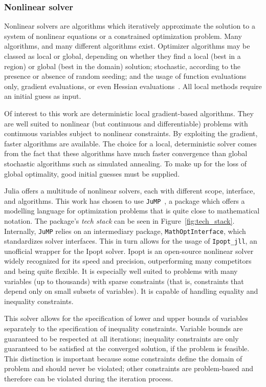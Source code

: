 \subsubsection{Nonlinear solver}

Nonlinear solvers are algorithms which iteratively approximate the solution to a system of nonlinear equations or a constrained optimization problem. Many algorithms, and many different algorithms exist. Optimizer algorithms may be classed as local or global, depending on whether they find a local (best in a region) or global (best in the domain) solution; stochastic, according to the presence or absence of random seeding; and the usage of function evaluations only, gradient evaluations, or even Hessian evaluations~\cite{numerical_recipes}. All local methods require an initial guess as input.

Of interest to this work are deterministic local gradient-based algorithms. They are well suited to nonlinear (but continuous and differentiable) problems with continuous variables subject to nonlinear constraints. By exploiting the gradient, faster algorithms are available. The choice for a local, deterministic solver comes from the fact that these algorithms have much faster convergence than global stochastic algorithms such as simulated annealing. To make up for the loss of global optimality, good initial guesses must be supplied.

Julia offers a multitude of nonlinear solvers, each with different scope, interface, and algorithms. This work has chosen to use \texttt{JuMP}~\cite{jump}, a package which offers a modelling language for optimization problems that is quite close to mathematical notation. The package's \textit{tech stack} can be seen in Figure~\ref{fig:tech_stack}. Internally, \texttt{JuMP} relies on an intermediary package, \texttt{MathOptInterface}, which standardizes solver interfaces. This in turn allows for the usage of \texttt{Ipopt\_jll}, an unofficial wrapper for the Ipopt solver. Ipopt is an open-source nonlinear solver widely recognized for its speed and precision, outperforming many competitors and being quite flexible. It is especially well suited to problems with many variables (up to thousands) with sparse constraints (that is, constraints that depend only on small subsets of variables). It is capable of handling equality and inequality constraints.

This solver allows for the specification of lower and upper bounds of variables separately to the specification of inequality constraints. Variable bounds are guaranteed to be respected at all iterations; inequality constraints are only guaranteed to be satisfied at the converged solution, if the problem is feasible. This distinction is important because some constraints define the domain of problem and should never be violated; other constraints are problem-based and therefore can be violated during the iteration process.

